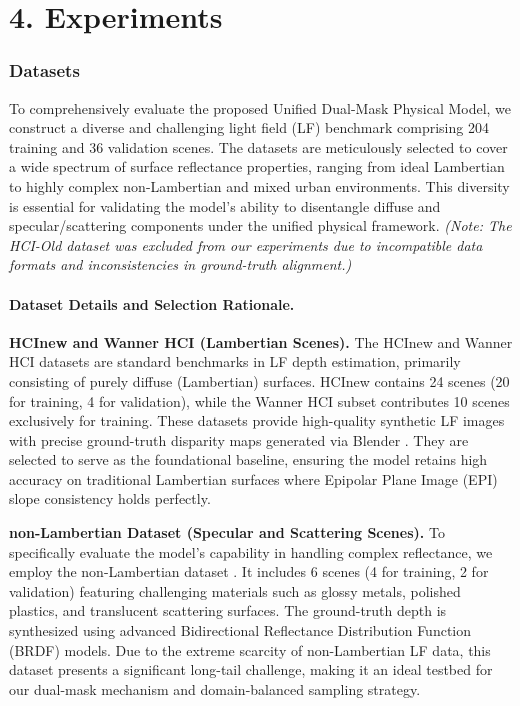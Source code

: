 \documentclass[lettersize,journal]{IEEEtran}
\begin{document}
\section{4. Experiments}

\subsubsection{Datasets}

To comprehensively evaluate the proposed Unified Dual-Mask Physical Model, we construct a diverse and challenging light field (LF) benchmark comprising 204 training and 36 validation scenes. The datasets are meticulously selected to cover a wide spectrum of surface reflectance properties, ranging from ideal Lambertian to highly complex non-Lambertian and mixed urban environments. This diversity is essential for validating the model's ability to disentangle diffuse and specular/scattering components under the unified physical framework. \textit{(Note: The HCI-Old dataset was excluded from our experiments due to incompatible data formats and inconsistencies in ground-truth alignment.)}

\paragraph{Dataset Details and Selection Rationale.}

\textbf{HCInew and Wanner HCI (Lambertian Scenes).} 
The HCInew  and Wanner HCI  datasets are standard benchmarks in LF depth estimation, primarily consisting of purely diffuse (Lambertian) surfaces. HCInew contains 24 scenes (20 for training, 4 for validation), while the Wanner HCI subset contributes 10 scenes exclusively for training. These datasets provide high-quality synthetic LF images with precise ground-truth disparity maps generated via Blender . They are selected to serve as the foundational baseline, ensuring the model retains high accuracy on traditional Lambertian surfaces where Epipolar Plane Image (EPI) slope consistency holds perfectly.

\textbf{non-Lambertian Dataset (Specular and Scattering Scenes).} 
To specifically evaluate the model's capability in handling complex reflectance, we employ the non-Lambertian dataset . It includes 6 scenes (4 for training, 2 for validation) featuring challenging materials such as glossy metals, polished plastics, and translucent scattering surfaces. The ground-truth depth is synthesized using advanced Bidirectional Reflectance Distribution Function (BRDF) models. Due to the extreme scarcity of non-Lambertian LF data, this dataset presents a significant long-tail challenge, making it an ideal testbed for our dual-mask mechanism and domain-balanced sampling strategy.
\end{document}
